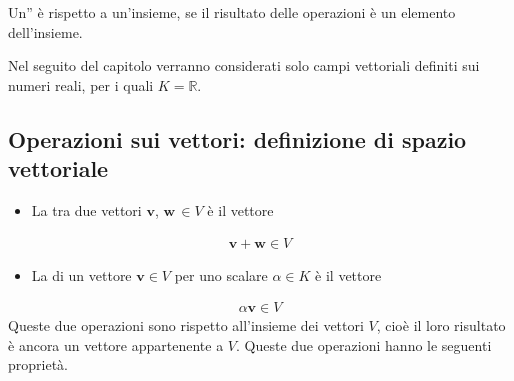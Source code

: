 \documentclass[letterpaper,10pt,italian]{jupyterBook}
\begin{document}
\sphinxAtStartPar
Un” è  rispetto a un’insieme, se il risultato delle operazioni è un elemento dell’insieme.

\sphinxAtStartPar
Nel seguito del capitolo verranno considerati solo campi vettoriali definiti sui numeri reali, per i quali \(K = \mathbb{R}\).


\subsection{Operazioni sui vettori: definizione di spazio vettoriale}
\label{\detokenize{ch/algebra/vector-algebra-def:operazioni-sui-vettori-definizione-di-spazio-vettoriale}}\label{\detokenize{ch/algebra/vector-algebra-def:math-hs-algebra-vector-def-operations}}\begin{itemize}
\item {} 
\sphinxAtStartPar
La  tra due vettori \(\mathbf{v}\), \(\mathbf{w} \, \in V\) è il vettore

\end{itemize}
\begin{equation*}
\begin{split}\mathbf{v} + \mathbf{w} \in V\end{split}
\end{equation*}\begin{itemize}
\item {} 
\sphinxAtStartPar
La  di un vettore \(\mathbf{v} \in V\) per uno scalare \(\alpha \in K\) è il vettore

\end{itemize}
\begin{equation*}
\begin{split}\alpha \mathbf{v} \in V\end{split}
\end{equation*}
\sphinxAtStartPar
Queste due operazioni sono  rispetto all’insieme dei vettori \(V\), cioè il loro risultato è ancora un vettore appartenente a \(V\). Queste due operazioni hanno le seguenti proprietà.
\end{document}
